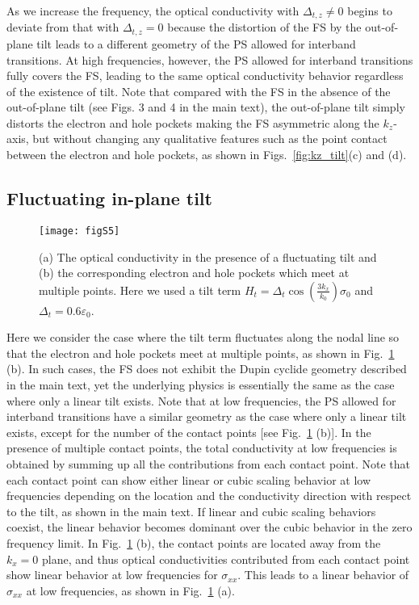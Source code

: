 \documentclass[aps,twocolumn,floatfix]{revtex4-1}
\begin{document}
As we increase the frequency, the optical conductivity with $\Delta_{t,z}\neq0$ begins to deviate from that with $\Delta_{t,z}=0$ because the distortion of the FS by the out-of-plane tilt leads to a different geometry of the PS allowed for interband transitions.
At high frequencies, however, the PS allowed for interband transitions fully covers the FS, leading to the same optical conductivity behavior regardless of the existence of tilt. Note that compared with the FS in the absence of the out-of-plane tilt (see Figs. 3 and 4 in the main text), the out-of-plane tilt simply distorts the electron and hole pockets making the FS asymmetric along the $k_z$-axis, but without changing any qualitative features such as the point contact between the electron and hole pockets, as shown in Figs.~\ref{fig:kz_tilt}(c) and (d).


\subsection{Fluctuating in-plane tilt}
\label{sec:arbitrary_tilt}
\begin{figure}[!htb]
\texttt{[image: figS5]}
\caption{
(a) The optical conductivity in the presence of a fluctuating tilt and (b) the corresponding electron and hole pockets which meet at multiple points. Here we used a tilt term $H_{t}=\Delta_{t} \cos{\left(\frac{3k_x}{k_0}\right)}\sigma_0$ and $\Delta_{t}=0.6\varepsilon_0$.
}
\label{fig:arbitrary_tilt}
\end{figure}

Here we consider the case where the tilt term fluctuates along the nodal line so that the electron and hole pockets meet at multiple points, as shown in Fig.~\ref{fig:arbitrary_tilt} (b). In such cases, the FS does not exhibit the Dupin cyclide geometry described in the main text, yet the underlying physics is essentially the same as the case where only a linear tilt exists. Note that at low frequencies, the PS allowed for interband transitions have a similar geometry as the case where only a linear tilt exists, except for the number of the contact points [see Fig.~\ref{fig:arbitrary_tilt} (b)]. In the presence of multiple contact points, the total conductivity at low frequencies is obtained by summing up all the contributions from each contact point. Note that each contact point can show either linear or cubic scaling behavior at low frequencies depending on the location and the conductivity direction with respect to the tilt, as shown in the main text. If linear and cubic scaling behaviors coexist, the linear behavior becomes dominant over the cubic behavior in the zero frequency limit. In Fig.~\ref{fig:arbitrary_tilt} (b), the contact points are located away from the $k_x=0$ plane, and thus optical conductivities contributed from each contact point show linear behavior at low frequencies for $\sigma_{xx}$. This leads to a linear behavior of $\sigma_{xx}$ at low frequencies, as shown in Fig.~\ref{fig:arbitrary_tilt} (a).
\end{document}
